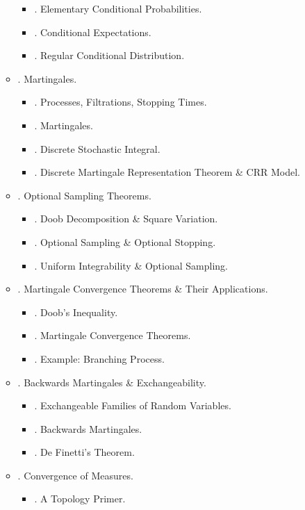 \documentclass{article}
\begin{document}
\begin{enumerate}
\begin{itemize}
		\begin{itemize}
			\item {. Elementary Conditional Probabilities.}
			\item {. Conditional Expectations.}
			\item {. Regular Conditional Distribution.}
		\end{itemize}
		\item {. Martingales.}
		\begin{itemize}
			\item {. Processes, Filtrations, Stopping Times.}
			\item {. Martingales.}
			\item {. Discrete Stochastic Integral.}
			\item {. Discrete Martingale Representation Theorem \& CRR Model.}
		\end{itemize}
		\item {. Optional Sampling Theorems.}
		\begin{itemize}
			\item {. Doob Decomposition \& Square Variation.}
			\item {. Optional Sampling \& Optional Stopping.}
			\item {. Uniform Integrability \& Optional Sampling.}
		\end{itemize}
		\item {. Martingale Convergence Theorems \& Their Applications.}
		\begin{itemize}
			\item {. Doob's Inequality.}
			\item {. Martingale Convergence Theorems.}
			\item {. Example: Branching Process.}
		\end{itemize}
		\item {. Backwards Martingales \& Exchangeability.}
		\begin{itemize}
			\item {. Exchangeable Families of Random Variables.}
			\item {. Backwards Martingales.}
			\item {. De Finetti's Theorem.}
		\end{itemize}
		\item {. Convergence of Measures.}
		\begin{itemize}
			\item {. A Topology Primer.}

\end{itemize}
\end{itemize}
\end{enumerate}
\end{document}
